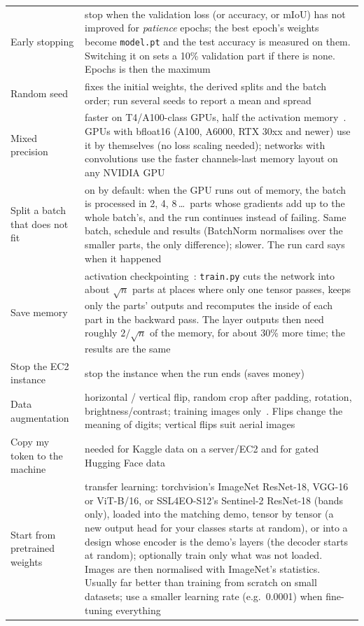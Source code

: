 \documentclass[11pt,a4paper]{article}
\newcommand{\file}[1]{\texttt{#1}}
\begin{document}
\begin{longtable}{@{}p{4.2cm}p{10.8cm}@{}}
Early stopping & stop when the validation loss (or accuracy, or mIoU) has not improved for \emph{patience} epochs; the best epoch's weights become \file{model.pt} and the test accuracy is measured on them. Switching it on sets a 10\% validation part if there is none. Epochs is then the maximum\\
Random seed & fixes the initial weights, the derived splits and the batch order; run several seeds to report a mean and spread\\
Mixed precision & faster on T4/A100-class GPUs, half the activation memory~\cite{micikevicius2017mixed}. GPUs with bfloat16 (A100, A6000, RTX 30xx and newer) use it by themselves (no loss scaling needed); networks with convolutions use the faster channels-last memory layout on any NVIDIA GPU\\
Split a batch that does not fit & on by default: when the GPU runs out of memory, the batch is processed in 2, 4, 8\,\dots\ parts whose gradients add up to the whole batch's, and the run continues instead of failing. Same batch, schedule and results (BatchNorm normalises over the smaller parts, the only difference); slower. The run card says when it happened\\
Save memory & activation checkpointing~\cite{chen2016checkpoint}: \file{train.py} cuts the network into about $\sqrt{n}$ parts at places where only one tensor passes, keeps only the parts' outputs and recomputes the inside of each part in the backward pass. The layer outputs then need roughly $2/\sqrt{n}$ of the memory, for about 30\% more time; the results are the same\\
Stop the EC2 instance & stop the instance when the run ends (saves money)\\
Data augmentation & horizontal / vertical flip, random crop after padding, rotation, brightness/contrast; training images only~\cite{cubuk2018autoaugment}. Flips change the meaning of digits; vertical flips suit aerial images\\
Copy my token to the machine & needed for Kaggle data on a server/EC2 and for gated Hugging Face data\\
Start from pretrained weights & transfer learning: torchvision's ImageNet ResNet-18, VGG-16 or ViT-B/16, or SSL4EO-S12's Sentinel-2 ResNet-18 (bands only), loaded into the matching demo, tensor by tensor (a new output head for your classes starts at random), or into a design whose encoder is the demo's layers (the decoder starts at random); optionally train only what was not loaded. Images are then normalised with ImageNet's statistics. Usually far better than training from scratch on small datasets; use a smaller learning rate (e.g.\ 0.0001) when fine-tuning everything\\
\bottomrule
\end{longtable}
\end{document}
